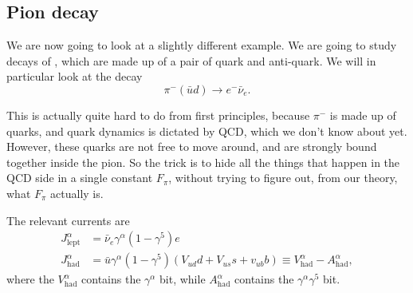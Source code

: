 \documentclass[a4paper]{article}
\begin{document}
\subsection{Pion decay}
We are now going to look at a slightly different example. We are going to study decays of , which are made up of a pair of quark and anti-quark. We will in particular look at the decay
\[
  \pi^- (\bar u d) \to e^- \bar{\nu}_e.
\]
\begin{center}
\end{center}
This is actually quite hard to do from first principles, because $\pi^-$ is made up of quarks, and quark dynamics is dictated by QCD, which we don't know about yet. However, these quarks are not free to move around, and are strongly bound together inside the pion. So the trick is to hide all the things that happen in the QCD side in a single constant $F_\pi$, without trying to figure out, from our theory, what $F_\pi$ actually is.

The relevant currents are
\begin{align*}
  J_{\mathrm{lept}}^\alpha &= \bar{\nu}_e \gamma^\alpha (1 - \gamma^5) e\\
  J_{\mathrm{had}}^\alpha &= \bar{u} \gamma^\alpha (1 - \gamma^5)(V_{ud} d + V_{us}s + v_{ub}b) \equiv V_{\mathrm{had}}^\alpha - A_{\mathrm{had}}^\alpha,
\end{align*}
where the $V_{\mathrm{had}}^\alpha$ contains the $\gamma^\alpha$ bit, while $A_{\mathrm{had}}^\alpha$ contains the $\gamma^\alpha \gamma^5$ bit.
\end{document}
